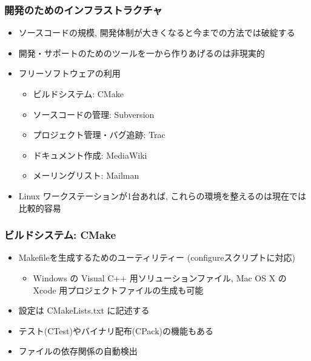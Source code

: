 \begin{frame}
  \frametitle{開発のためのインフラストラクチャ}
  \begin{itemize}
  \item ソースコードの規模, 開発体制が大きくなると今までの方法では破綻する
  \item 開発・サポートのためのツールを一から作りあげるのは非現実的
  \item フリーソフトウェアの利用
    \begin{itemize}
    \item ビルドシステム: CMake
    \item ソースコードの管理: Subversion
    \item プロジェクト管理・バグ追跡: Trac
    \item ドキュメント作成: MediaWiki
    \item メーリングリスト: Mailman
    \end{itemize}
  \item Linux ワークステーションが1台あれば, これらの環境を整えるのは現在では比較的容易
  \end{itemize}
\end{frame}

\begin{frame}
  \frametitle{ビルドシステム: CMake}
  \begin{itemize}
    \setlength{\itemsep}{1em}
  \item Makefileを生成するためのユーティリティー (configureスクリプトに対応)
    \begin{itemize}
    \item Windows の Visual C++ 用ソリューションファイル, Mac OS X の Xcode 用プロジェクトファイルの生成も可能
    \end{itemize}
  \item 設定は CMakeLists.txt に記述する
  \item テスト(CTest)やバイナリ配布(CPack)の機能もある
  \item ファイルの依存関係の自動検出
  \end{itemize}
\end{frame}

